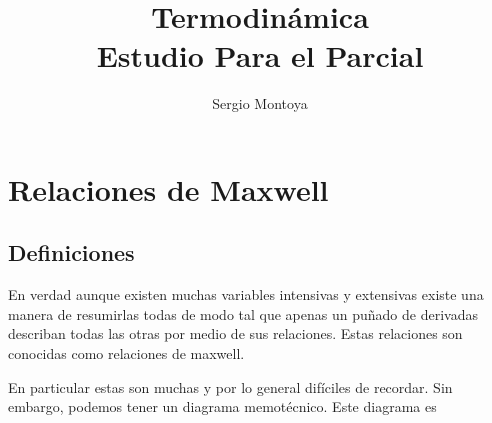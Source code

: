 \documentclass{report}
\title{\Huge{Termodinámica}\\Estudio Para el Parcial}
\author{\huge{Sergio Montoya}}
\date{}
\begin{document}
\maketitle
\newpage%
\tableofcontents
\pagebreak

\chapter{Relaciones de Maxwell}
\section{Definiciones}

En verdad aunque existen muchas variables intensivas y extensivas existe una manera de resumirlas todas de modo tal que apenas un puñado de derivadas describan todas las otras por medio de sus relaciones. Estas relaciones son conocidas como relaciones de maxwell. 

En particular estas son muchas y por lo general difíciles de recordar. Sin embargo, podemos tener un diagrama memotécnico. Este diagrama es
\end{document}
